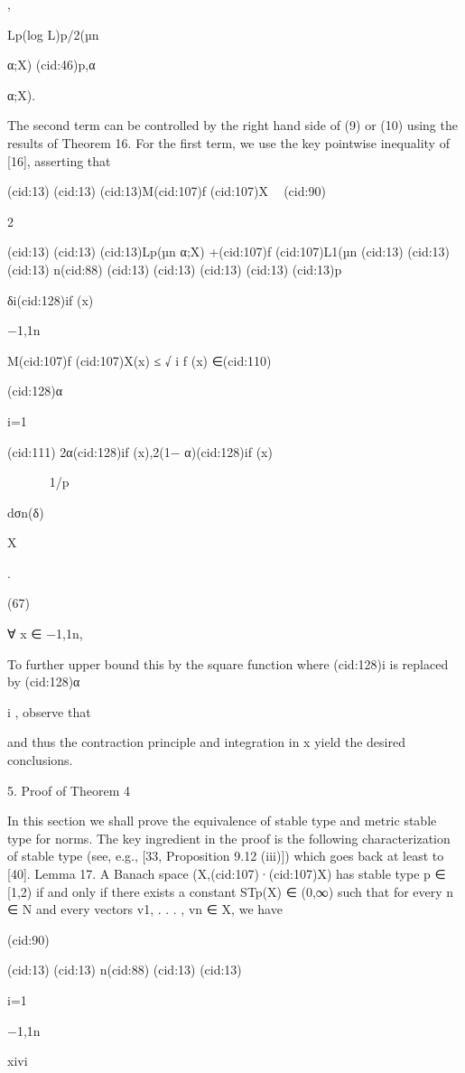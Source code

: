 {,

Lp(log L)p/2(µn

α;X) (cid:46)p,α

α;X).

The second term can be controlled by the right hand side of (9) or (10) using the results of
Theorem 16. For the ﬁrst term, we use the key pointwise inequality of [16], asserting that

(cid:13)
(cid:13)
(cid:13)M(cid:107)f (cid:107)X

(cid:90)





2

(cid:13)
(cid:13)
(cid:13)Lp(µn
α;X) +(cid:107)f (cid:107)L1(µn
(cid:13)
(cid:13)
(cid:13) n(cid:88)
(cid:13)
(cid:13)
(cid:13)
(cid:13)
(cid:13)p

δi(cid:128)if (x)

{−1,1}n

M(cid:107)f (cid:107)X(x) ≤ √
i f (x) ∈(cid:110)

(cid:128)α

i=1

(cid:111)
2α(cid:128)if (x),2(1− α)(cid:128)if (x)






1/p

dσn(δ)

X

.

(67)

∀ x ∈ {−1,1}n,

To further upper bound this by the square function where (cid:128)i is replaced by (cid:128)α

i , observe that

and thus the contraction principle and integration in x yield the desired conclusions.

5. Proof of Theorem 4

In this section we shall prove the equivalence of stable type and metric stable type for norms.
The key ingredient in the proof is the following characterization of stable type (see, e.g., [33,
Proposition 9.12 (iii)]) which goes back at least to [40].
Lemma 17. A Banach space (X,(cid:107)·(cid:107)X) has stable type p ∈ [1,2) if and only if there exists a constant
STp(X) ∈ (0,∞) such that for every n ∈ N and every vectors v1, . . . , vn ∈ X, we have

(cid:90)

(cid:13)
(cid:13) n(cid:88)
(cid:13)
(cid:13)

i=1

{−1,1}n

xivi

}

